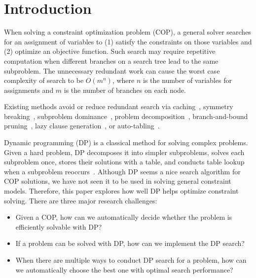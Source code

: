 \section{Introduction}
When solving a constraint optimization problem (COP), a general solver searches for an assignment of variables to (1) satisfy the constraints on those variables and (2) optimize an objective function. Such search may require repetitive computation when different branches on a search tree lead to the same subproblem. The unnecessary redundant work can cause the worst case complexity of search to be $O(m^n)$, where $n$ is the number of variables for assignments and $m$ is the number of branches on each node. 

Existing methods avoid or reduce redundant search via caching~\cite{Smith2005}, symmetry breaking~\cite{Gent2006}, subproblem dominance~\cite{chu2012exploiting}, problem  decomposition~\cite{kitching2007symmetric}, branch-and-bound pruning~\cite{marinescu2005and}, lazy clause generation~\cite{ohrimenko2009propagation}, or auto-tabling~\cite{dekker2017auto,zhou2015constraint}.

Dynamic programming (DP) is 
a classical method for solving complex problems. 
Given a hard problem, DP decomposes it into simpler subproblems, solves each subproblem once, stores their solutions with a table, and conducts table lookup when a subproblem reoccurs~\cite{Bertsekas:2000}. 
Although DP seems a nice search algorithm for COP solutions, we have not seen it to be used in solving general constraint models. 
Therefore, this paper explores how well DP helps optimize constraint solving. 
There are three major research challenges: 


\begin{itemize}
    \item Given a COP, how can we automatically decide whether the problem is efficiently solvable with DP? 
    \item If a problem can be solved with DP, how can we implement the DP search?
    \item When there are multiple ways to conduct DP search for a problem, how can we automatically choose the best one with optimal search performance? 
\end{itemize}

